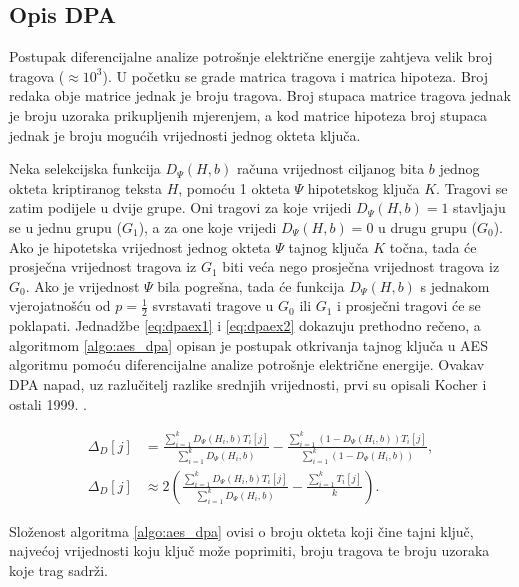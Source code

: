 \documentclass[times, utf8, numeric, diplomski]{fer}
\begin{document}
\subsection{Opis DPA}
Postupak diferencijalne analize potrošnje električne energije zahtjeva velik broj tragova ($\approx 10^3$). U početku se grade matrica tragova i matrica hipoteza. Broj redaka obje matrice jednak je broju tragova. Broj stupaca matrice tragova jednak je broju uzoraka prikupljenih mjerenjem, a kod matrice hipoteza broj stupaca jednak je broju mogućih vrijednosti jednog okteta ključa. 

Neka selekcijska funkcija $D_\Psi(H, b)$ računa vrijednost ciljanog bita $b$ jednog okteta kriptiranog teksta $H$, pomoću 1 okteta $\Psi$ hipotetskog ključa $K$. Tragovi se zatim podijele u dvije grupe. Oni tragovi za koje vrijedi $D_\Psi(H, b) = 1$ stavljaju se u jednu grupu (\textit{$G_1$}), a za one koje vrijedi $D_\Psi(H, b) = 0$ u drugu grupu (\textit{$G_0$}). Ako je hipotetska vrijednost jednog okteta $\Psi$ tajnog ključa $K$ točna, tada će prosječna vrijednost tragova iz \textit{$G_1$} biti veća nego prosječna vrijednost tragova iz \textit{$G_0$}. Ako je vrijednost $\Psi$ bila pogrešna, tada će funkcija $D_\Psi(H, b)$ s jednakom vjerojatnošću od $p=\frac{1}{2}$ svrstavati tragove u \textit{$G_0$} ili \textit{$G_1$} i prosječni tragovi će se poklapati. Jednadžbe \ref{eq:dpaex1} i \ref{eq:dpaex2} dokazuju prethodno rečeno, a algoritmom \ref{algo:aes_dpa} opisan je postupak otkrivanja tajnog ključa u AES algoritmu pomoću diferencijalne analize potrošnje električne energije. Ovakav DPA napad, uz razlučitelj razlike srednjih vrijednosti, prvi su opisali Kocher i ostali 1999. \citep{gierlichs2009empirical}.

\begin{align}
\Delta_{D}\left[j\right] &= \frac{\sum_{i=1}^{k}D_{\Psi}\left(H_i,b\right)T_i\left[j\right]}{\sum_{i=1}^{k}D_{\Psi}\left(H_i,b\right)} - 
\frac{\sum_{i=1}^{k}\left(1-D_{\Psi}\left(H_i,b\right)\right)T_i\left[j\right]}{\sum_{i=1}^{k}\left(1-D_{\Psi}\left(H_i,b\right)\right)}, \label{eq:dpaex1}\\
\Delta_{D}\left[j\right] &\approx 2 \left( \frac{\sum_{i=1}^{k}D_{\Psi}\left(H_i,b\right)T_i\left[j\right]}{\sum_{i=1}^{k}D_{\Psi}\left(H_i,b\right)} - \frac{\sum_{i=1}^{k}T_i\left[j\right]}{k}  \right).\label{eq:dpaex2}
\end{align}

\noindent Složenost algoritma \ref{algo:aes_dpa} ovisi o broju okteta koji čine tajni ključ, najvećoj vrijednosti koju ključ može poprimiti, broju tragova te broju uzoraka koje trag sadrži.
\end{document}
